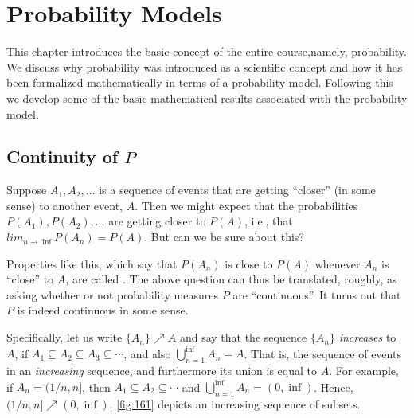 \chapter{Probability Models}\label{chap:probability_models}
\minitoc
This chapter introduces the basic concept of the entire course,\linebreak[2] namely, probability. We discuss why probability was introduced as a scientific concept and how it has been formalized mathematically in terms of a probability model. Following this we develop some of the basic mathematical results associated with the probability model.







\section{Continuity of $P$}
Suppose $A_1, A_2, \ldots$ is a sequence of events that are getting ``closer'' (in some sense) to another event, $A$. Then we might expect that the probabilities $P(A_1), P(A_2), \ldots$ are getting closer to $P(A)$, i.e., that $lim_{n\to\inf}P(A_n)=P(A)$. But can we be sure about this?

Properties like this, which say that $P(A_n)$ is close to $P(A)$ whenever $A_n$ is ``close'' to $A$, are called . The above question can thus be translated, roughly, as asking whether or not probability measures $P$ are ``continuous''. It turns out that $P$ is indeed continuous in some sense.

Specifically, let us write $\{A_n\} \nearrow A$ and say that the sequence $\{A_n\}$ \emph{increases} to $A$, if $A_1 \subseteq A_2 \subseteq A_3 \subseteq \cdots$, and also $\bigcup^{\inf}_{n=1} A_n=A$. That is, the sequence of events in an \emph{increasing} sequence, and furthermore its union is equal to $A$. For example, if $A_n=(1/n,n]$, then $A_1 \subseteq A_2\subseteq\cdots$ and $\bigcup_{n=1}^{\inf}A_n=(0,\inf)$. Hence, ${(1/n,n]}\nearrow(0,\inf)$. \autoref{fig:161} depicts an increasing sequence of subsets.

